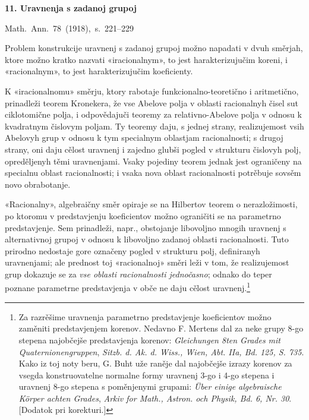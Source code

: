 \documentclass[11pt]{article}
\begin{document}

\begin{center}
{\Large\bfseries 11. Uravnenja s zadanoj grupoj}\par
\vspace{1.5em}
\mbox{Math. Ann. 78 (1918), s. 221--229}
\end{center}

\vspace{4em}

Problem konstrukcije uravnenj s zadanoj grupoj možno napadati v dvuh směrjah, ktore možno kratko nazvati «iracionalnym», to jest harakterizujučim koreni, i «racionalnym», to jest harakterizujučim koeficienty.

K «iracionalnomu» směrju, ktory rabotaje funkcionalno-teoretično i aritmetično, prinadleži teorem Kronekera, že vse Abelove polja v oblasti racionalnyh čisel sut ciklotomične polja, i odpovědajuči teoremy za relativno-Abelove polja v odnosu k kvadratnym čislovym poljam. Ty teoremy daju, s jednej strany, realizujemost vsih Abelovyh grup v odnosu k tym specialnym oblastjam racionalnosti; s drugoj strany, oni daju cělost uravnenj i zajedno glubši pogled v strukturu čislovyh polj, opreděljenyh těmi uravnenjami. Vsaky pojediny teorem jednak jest ograničeny na specialnu oblast racionalnosti; i vsaka nova oblast racionalnosti potrěbuje sovsěm novo obrabotanje.

«Racionalny», algebraičny směr opiraje se na Hilbertov teorem o nerazložimosti, po ktoromu v predstavjenju koeficientov možno ograničiti se na parametrno predstavjenje. Sem prinadleži, napr., obstojanje libovoljno mnogih uravnenj s alternativnoj grupoj v odnosu k libovoljno zadanoj oblasti racionalnosti. Tuto prirodno nedostaje gore označeny pogled v strukturu polj, definiranyh uravnenjami; ale prednost toj «racionalnoj» směri leži v tom, že realizujemost grup dokazuje se za {\itshape vse oblasti racionalnosti jednočasno}; odnako do teper poznane parametrne predstavjenja v obče ne daju cělost uravnenj.\footnote{Za razrěšime uravnenja parametrno predstavjenje koeficientov možno zaměniti predstavjenjem korenov. Nedavno F. Mertens dal za neke grupy 8-go stepena najobčejše predstavjenja korenov: \emph{Gleichungen 8ten Grades mit Quaternionengruppen}, \emph{Sitzb. d. Ak. d. Wiss., Wien, Abt. IIa, Bd. 125, S. 735}. Kako iz toj noty beru, G. Buht uže raněje dal najobčejše izrazy korenov za vsegda konstruovatelne normalne formy uravnenj 3-go i 4-go stepena i uravnenj 8-go stepena s poměnjenymi grupami: \emph{Über einige algebraische Körper achten Grades}, \emph{Arkiv for Math., Astron. och Physik, Bd. 6, Nr. 30}. [Dodatok pri korekturi.]} 
\end{document}
